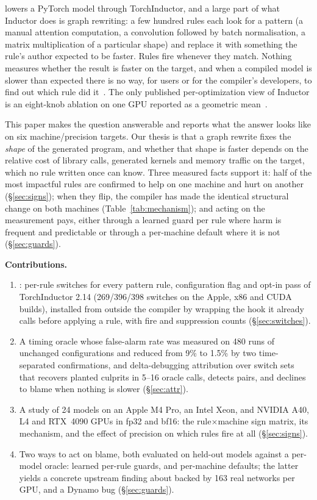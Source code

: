  lowers a PyTorch model through TorchInductor, and a large part of what Inductor does is graph
rewriting: a few hundred rules each look for a pattern (a manual attention computation, a convolution followed by
batch normalisation, a matrix multiplication of a particular shape) and replace it with something the rule's author
expected to be faster. Rules fire whenever they match. Nothing measures whether the result is faster on the target,
and when a compiled model is slower than expected there is no way, for users or for the compiler's developers, to
find out which rule did it~\cite{rfc}. The only published per-optimization view of Inductor is an eight-knob
ablation on one GPU reported as a geometric mean~\cite{pt2}.

This paper makes the question answerable and reports what the answer looks like on six machine/precision targets.
Our thesis is that a graph rewrite fixes the \emph{shape} of the generated program, and whether that shape is faster
depends on the relative cost of library calls, generated kernels and memory traffic on the target, which no rule
written once can know. Three measured facts support it: half of the most impactful rules are confirmed to help on
one machine and hurt on another (\S\ref{sec:signs}); when they flip, the compiler has made the identical structural
change on both machines (Table~\ref{tab:mechanism}); and acting on the measurement pays, either through a learned
guard per rule where harm is frequent and predictable or through a per-machine default where it is not
(\S\ref{sec:guards}).

\noindent\textbf{Contributions.}
\begin{enumerate}[leftmargin=*]
\item \tool: per-rule switches for every pattern rule, configuration flag and opt-in pass of TorchInductor 2.14
  (269/396/398 switches on the Apple, x86 and CUDA builds), installed from outside the compiler by wrapping the hook it
  already calls before applying a rule, with fire and suppression counts (\S\ref{sec:switches}).
\item A timing oracle whose false-alarm rate was measured on 480 runs of unchanged configurations and reduced from
  9\% to 1.5\% by two time-separated confirmations, and delta-debugging attribution over switch sets that recovers
  planted culprits in 5--16 oracle calls, detects pairs, and declines to blame when nothing is slower
  (\S\ref{sec:attr}).
\item A study of 24 models on an Apple M4 Pro, an Intel Xeon, and NVIDIA A40, L4 and RTX~4090 GPUs in fp32 and bf16:
  the rule$\times$machine sign matrix, its mechanism, and the effect of precision on which rules fire at all
  (\S\ref{sec:signs}).
\item Two ways to act on blame, both evaluated on held-out models against a per-model oracle: learned per-rule guards,
  and per-machine defaults; the latter yields a concrete upstream finding about  backed by 163 real
  networks per GPU, and a Dynamo bug (\S\ref{sec:guards}).
\end{enumerate}

